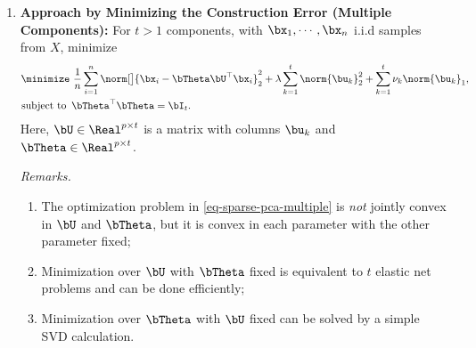 \documentclass[12pt]{article}
\begin{document}
\begin{enumerate}[label=\textbf{\arabic*.}]
	\item \textbf{Approach by Minimizing the Construction Error (Multiple Components):} For $t > 1$ components, with $\bx_1, \cdots, \bx_n$ i.i.d samples from $X$, minimize 
	\begin{equation}\label{eq-sparse-pca-multiple}
		\begin{aligned}
			\minimize & \ \frac{1}{n} \sum_{i=1}^n \norm[\big]{\bx_i - \bTheta \bU^\top \bx_i}_2^2 + \lambda \sum_{k=1}^t \norm{\bu_k}_2^2 + \sum_{k=1}^t \nu_k \norm{\bu_k}_1,  \\ 
			\text{subject to } & \, \bTheta^\top \bTheta = \bI_t. 
		\end{aligned}
	\end{equation}
	Here, $\bU \in \Real^{p \times t}$ is a matrix with columns $\bu_k$ and $\bTheta \in \Real^{p \times t}$. 
	
	\textit{Remarks.} 
	\begin{enumerate}
		\item The optimization problem in \eqref{eq-sparse-pca-multiple} is \emph{not} jointly convex in $\bU$ and $\bTheta$, but it is convex in each parameter with the other parameter fixed; 
		\item Minimization over $\bU$ with $\bTheta$ fixed is equivalent to $t$ elastic net problems and can be done efficiently; 
		\item Minimization over $\bTheta$ with $\bU$ fixed can be solved by a simple SVD calculation. 
	\end{enumerate}

\end{enumerate}
\end{document}
